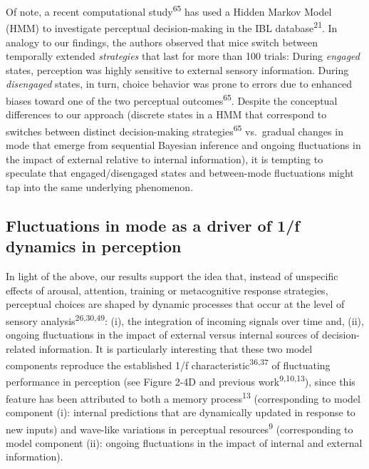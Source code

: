 \documentclass[
]{article}
\begin{document}
Of note, a recent computational study\textsuperscript{65} has used a
Hidden Markov Model (HMM) to investigate perceptual decision-making in
the IBL database\textsuperscript{21}. In analogy to our findings, the
authors observed that mice switch between temporally extended
\emph{strategies} that last for more than 100 trials: During
\emph{engaged} states, perception was highly sensitive to external
sensory information. During \emph{disengaged} states, in turn, choice
behavior was prone to errors due to enhanced biases toward one of the
two perceptual outcomes\textsuperscript{65}. Despite the conceptual
differences to our approach (discrete states in a HMM that correspond to
switches between distinct decision-making strategies\textsuperscript{65}
vs.~gradual changes in mode that emerge from sequential Bayesian
inference and ongoing fluctuations in the impact of external relative to
internal information), it is tempting to speculate that
engaged/disengaged states and between-mode fluctuations might tap into
the same underlying phenomenon.

\hypertarget{fluctuations-in-mode-as-a-driver-of-1f-dynamics-in-perception}{%
\subsection{Fluctuations in mode as a driver of 1/f dynamics in
perception}\label{fluctuations-in-mode-as-a-driver-of-1f-dynamics-in-perception}}

In light of the above, our results support the idea that, instead of
unspecific effects of arousal, attention, training or metacognitive
response strategies, perceptual choices are shaped by dynamic processes
that occur at the level of sensory analysis\textsuperscript{26,30,49}:
(i), the integration of incoming signals over time and, (ii), ongoing
fluctuations in the impact of external versus internal sources of
decision-related information. It is particularly interesting that these
two model components reproduce the established 1/f
characteristic\textsuperscript{36,37} of fluctuating performance in
perception (see Figure 2-4D and previous work\textsuperscript{9,10,13}),
since this feature has been attributed to both a memory
process\textsuperscript{13} (corresponding to model component (i):
internal predictions that are dynamically updated in response to new
inputs) and wave-like variations in perceptual
resources\textsuperscript{9} (corresponding to model component (ii):
ongoing fluctuations in the impact of internal and external
information).
\end{document}

